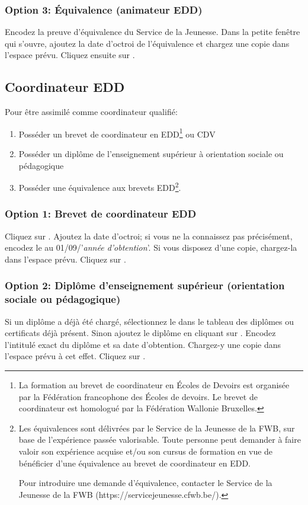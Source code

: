 \subsubsection{Option 3: Équivalence (animateur EDD)}
Encodez la preuve d'équivalence du Service de la Jeunesse. Dans la petite fenêtre qui s'ouvre, ajoutez la date d'octroi de l'équivalence et chargez une copie dans l'espace prévu. Cliquez ensuite sur . 



\subsection{Coordinateur EDD} \label{ssec:coordinateur_edd}
Pour être assimilé comme coordinateur qualifié:
\begin{enumerate}
    \item Posséder un brevet de coordinateur en EDD\footnote{La formation au brevet de coordinateur en Écoles de Devoirs est organisée par la Fédération francophone des Écoles de devoirs. Le brevet de coordinateur est homologué par la Fédération Wallonie Bruxelles.} ou CDV
    \item Posséder un diplôme de l’enseignement supérieur à orientation sociale ou pédagogique
    \item Posséder une équivalence aux brevets EDD\footnote{Les équivalences sont délivrées par le Service de la Jeunesse de la FWB, sur base de l’expérience passée valorisable. Toute personne peut demander à faire valoir son expérience acquise et/ou son cursus de formation en vue de bénéficier d’une équivalence au brevet de coordinateur en EDD.

    Pour introduire une demande d'équivalence, contacter le Service de la Jeunesse de la FWB (https://servicejeunesse.cfwb.be/).}.
\end{enumerate}



\subsubsection{Option 1: Brevet de coordinateur EDD}
Cliquez sur . Ajoutez la date d'octroi; si vous ne la connaissez pas précisément, encodez le au 01/09/'\textit{année d'obtention}'. Si vous disposez d'une copie, chargez-la dans l'espace prévu. Cliquez sur .

\subsubsection{Option 2: Diplôme d'enseignement supérieur (orientation sociale ou pédagogique)}
Si un diplôme a déjà été chargé, sélectionnez le dans le tableau des diplômes ou certificats déjà présent.
Sinon ajoutez le diplôme en cliquant sur . Encodez l'intitulé exact du diplôme et sa date d'obtention. Chargez-y une copie dans l'espace prévu à cet effet. Cliquez sur .


